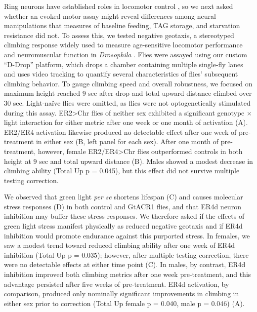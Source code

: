 Ring neurons have established roles in locomotor control \citep{buhl2021,kottler2019}, so we next asked whether an evoked motor assay might reveal differences among neural manipulations that measures of baseline feeding, TAG storage, and starvation resistance did not.
To assess this, we tested negative geotaxis, a stereotyped climbing response widely used to measure age-sensitive locomotor performance and neuromuscular function in \textit{Drosophila} \citep{rhodenizer2008, jones2009}. 
Flies were assayed using our custom “D-Drop” platform, which drops a chamber containing multiple single-fly lanes and uses video tracking to quantify several characteristics of flies' subsequent climbing behavior. 
To gauge climbing speed and overall robustness, we focused on maximum height reached 9 sec after drop and total upward distance climbed over 30 sec. 
Light-naïve flies were omitted, as flies were not optogenetically stimulated during this assay. 
ER2>Chr flies of neither sex exhibited a significant genotype $\times$ light interaction for either metric after one week or one month of activation (A). 
ER2/ER4 activation likewise produced no detectable effect after one week of pre-treatment in either sex (B, left panel for each sex). 
After one month of pre-treatment, however, female ER2/ER4>Chr flies outperformed controls in both height at 9 sec and total upward distance (B). Males showed a modest decrease in climbing ability (Total Up p = 0.045), but this effect did not survive multiple testing correction.  

We observed that green light \textit{per se} shortens lifespan (C) and causes molecular stress responses (D) in both control and GtACR1 flies, and that ER4d neuron inhibition may buffer these stress responses. 
We therefore asked if the effects of green light stress manifest physically as reduced negative geotaxis and if ER4d inhibition would promote endurance against this purported stress. 
In females, we saw a modest trend toward reduced climbing ability after one week of ER4d inhibition (Total Up p = 0.035); however, after multiple testing correction, there were no detectable effects at either time point (C). 
In males, by contrast, ER4d inhibition improved both climbing metrics after one week pre-treatment, and this advantage persisted after five weeks of pre-treatment. 
ER4d activation, by comparison, produced only nominally significant improvements in climbing in either sex prior to correction (Total Up female p = 0.040, male p = 0.046) (A). 

